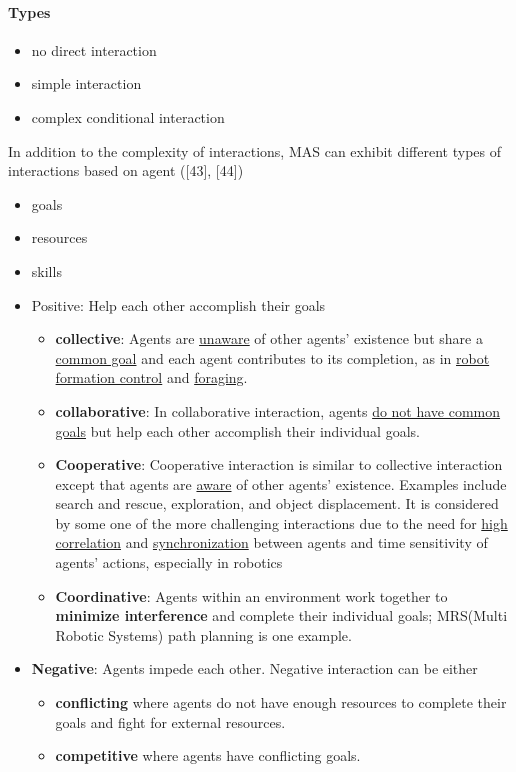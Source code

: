 \documentclass{article}
\begin{document}
		\paragraph{Types}
			\begin{itemize}
				\item no direct interaction
				\item simple interaction
				\item complex conditional interaction
			\end{itemize}
			In addition to the complexity of interactions, MAS can exhibit different types of interactions based on agent (\cite{rizk-2018-decision-making-in-multiagent-systems-a-survey}[43], [44])
			\begin{itemize}
				\item goals
				\item resources
				\item skills
			\end{itemize}
		\begin{itemize}
			\item Positive: Help each other accomplish their goals
				\begin{itemize}
					\item \textbf{collective}: Agents are \underline{unaware} of other agents’ existence but share a \underline{common goal} and each agent contributes to its completion, as in \underline{robot formation control} and \underline{foraging}.  
					
					\item \textbf{collaborative}: In collaborative interaction, agents \underline{do not have common goals} but help each other accomplish their individual goals.
					
					\item \textbf{Cooperative}: Cooperative interaction is similar to collective interaction except that agents are \underline{aware} of other agents’ existence. Examples include search and rescue, exploration, and object displacement. It is considered by some one of the more challenging interactions due to the need for \underline{high correlation} and \underline{synchronization} between agents and time sensitivity of agents’ actions, especially in robotics  \citep{rizk-2018-decision-making-in-multiagent-systems-a-survey}
					
					\item \textbf{Coordinative}: Agents within an environment work together to \textbf{minimize interference} and complete their individual goals; MRS(Multi Robotic Systems) path planning is one example.
				\end{itemize}
			\item \textbf{Negative}: Agents impede each other. Negative interaction can be either
				\begin{itemize}
					\item \textbf{conflicting} where agents do not have enough resources to complete their goals and fight for external resources.
					
					\item \textbf{competitive} where agents have conflicting goals.
				\end{itemize}
		\end{itemize}
		
\end{document}
